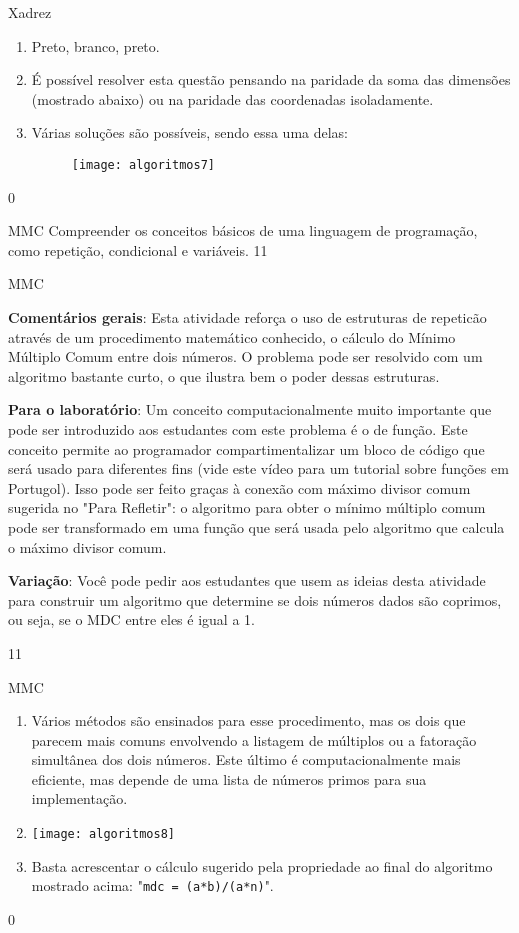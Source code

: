 \begin{answer}{Xadrez}
{
\begin{enumerate}
\item Preto, branco, preto.
\item É possível resolver esta questão pensando na paridade da soma das dimensões (mostrado abaixo) ou na paridade das coordenadas isoladamente.

\item Várias soluções são possíveis, sendo essa uma delas:

\begin{figure}[H]
\centering

\texttt{[image: algoritmos7]}
\end{figure}
\end{enumerate}
}{0}
\end{answer}
\begin{objectives}{MMC}
{
Compreender os conceitos básicos de uma linguagem de programação, como repetição, condicional e variáveis.
}{1}{1}
\end{objectives}
\begin{sugestions}{MMC}
{
\textbf{Comentários gerais}: Esta atividade reforça o uso de estruturas de repeticão através de um procedimento matemático conhecido, o cálculo do Mínimo Múltiplo Comum entre dois números. O problema pode ser resolvido com um algoritmo bastante curto, o que ilustra bem o poder dessas estruturas.

\textbf{Para o laboratório}: Um conceito computacionalmente muito importante que pode ser introduzido aos estudantes com este problema é o de função. Este conceito permite ao programador compartimentalizar um bloco de código que será usado para diferentes fins (vide este vídeo para um tutorial sobre funções em Portugol). Isso pode ser feito graças à conexão com máximo divisor comum sugerida no "Para Refletir": o algoritmo para obter o mínimo múltiplo comum pode ser transformado em uma função que será usada pelo algoritmo que calcula o máximo divisor comum.

\textbf{Variação}: Você pode pedir aos estudantes que usem as ideias desta atividade para construir um algoritmo que determine se dois números dados são coprimos, ou seja, se o MDC entre eles é igual a 1.
}{1}{1}
\end{sugestions}
\begin{answer}{MMC}
{
\begin{enumerate}
\item Vários métodos são ensinados para esse procedimento, mas os dois que parecem mais comuns envolvendo a listagem de múltiplos ou a fatoração simultânea dos dois números. Este último é computacionalmente mais eficiente, mas depende de uma lista de números primos para sua implementação.

\item {}
{
\texttt{[image: algoritmos8]}
}

\item Basta acrescentar o cálculo sugerido pela propriedade ao final do algoritmo mostrado acima: "\texttt{mdc = (a*b)/(a*n)}".
\end{enumerate}
}{0}
\end{answer}
